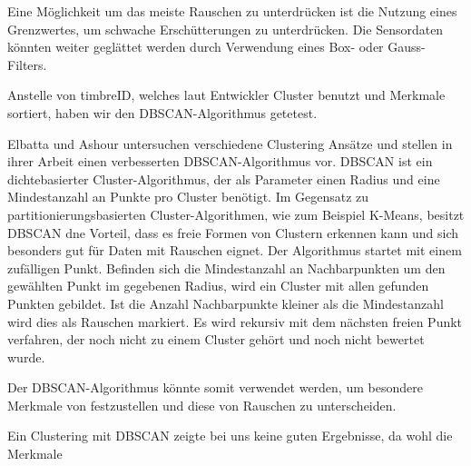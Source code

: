 Eine Möglichkeit um das meiste Rauschen zu unterdrücken ist die Nutzung eines Grenzwertes, um schwache Erschütterungen zu unterdrücken.
Die Sensordaten könnten weiter geglättet werden durch Verwendung eines Box- oder Gauss-Filters.

Anstelle von timbreID, welches laut Entwickler \cite{timbreID} Cluster benutzt und Merkmale sortiert, haben wir den DBSCAN-Algorithmus getetest.

Elbatta und Ashour untersuchen verschiedene Clustering Ansätze und stellen in ihrer Arbeit \cite{Elbatta2013ADM} einen verbesserten DBSCAN-Algorithmus vor.
DBSCAN ist ein  dichtebasierter Cluster-Algorithmus, der als Parameter einen Radius und eine Mindestanzahl an Punkte pro Cluster benötigt.
Im Gegensatz zu partitionierungsbasierten Cluster-Algorithmen, wie zum Beispiel K-Means, besitzt DBSCAN dne Vorteil, dass es freie Formen von Clustern erkennen kann und sich besonders gut für Daten mit Rauschen eignet.
Der Algorithmus startet mit einem zufälligen Punkt.
Befinden sich die Mindestanzahl an Nachbarpunkten um den gewählten Punkt im gegebenen Radius, wird ein Cluster mit allen gefunden Punkten gebildet.
Ist die Anzahl Nachbarpunkte kleiner als die Mindestanzahl wird dies als Rauschen markiert.
Es wird rekursiv mit dem nächsten freien Punkt verfahren, der noch nicht zu einem Cluster gehört und noch nicht bewertet wurde.

Der DBSCAN-Algorithmus könnte somit verwendet werden, um besondere Merkmale von festzustellen und diese von Rauschen zu unterscheiden.

Ein Clustering mit DBSCAN zeigte bei uns keine guten Ergebnisse, da wohl die Merkmale
